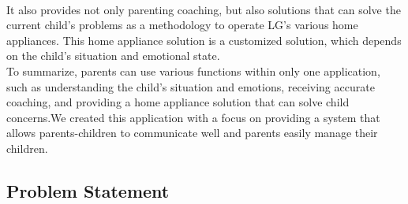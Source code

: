 \documentclass[conference]{IEEEtran}
\begin{document}
\\
It also provides not only parenting coaching, but also solutions that can solve the current child's problems as a methodology to operate LG's various home appliances. This home appliance solution is a customized solution, which depends on the child's situation and emotional state. 
\\
To summarize, parents can use various functions within only one application, such as understanding the child's situation and emotions, receiving accurate coaching, and providing a home appliance solution that can solve child concerns.We created this application with a focus on providing a system that allows parents-children to communicate well and parents easily manage their children.

\subsection{\large{Problem Statement}}
\end{document}
